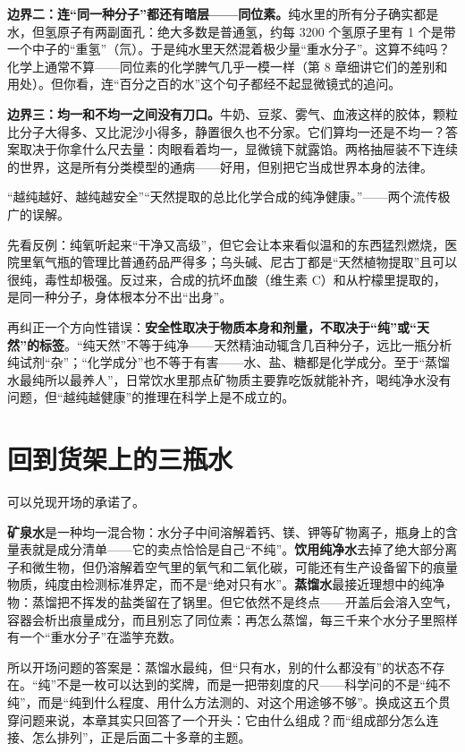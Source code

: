 \textbf{边界二：连“同一种分子”都还有暗层——同位素。}纯水里的所有分子确实都是水，但氢原子有两副面孔：绝大多数是普通氢，约每 3200 个氢原子里有 1 个是带一个中子的“重氢”（氘）。于是纯水里天然混着极少量“重水分子”。这算不纯吗？化学上通常不算——同位素的化学脾气几乎一模一样（第 8 章细讲它们的差别和用处）。但你看，连“百分之百的水”这个句子都经不起显微镜式的追问。

\textbf{边界三：均一和不均一之间没有刀口。}牛奶、豆浆、雾气、血液这样的胶体，颗粒比分子大得多、又比泥沙小得多，静置很久也不分家。它们算均一还是不均一？答案取决于你拿什么尺去量：肉眼看着均一，显微镜下就露馅。两格抽屉装不下连续的世界，这是所有分类模型的通病——好用，但别把它当成世界本身的法律。

\begin{wuqu}
“越纯越好、越纯越安全”“天然提取的总比化学合成的纯净健康。”——两个流传极广的误解。

先看反例：纯氧听起来“干净又高级”，但它会让本来看似温和的东西猛烈燃烧，医院里氧气瓶的管理比普通药品严得多；乌头碱、尼古丁都是“天然植物提取”且可以很纯，毒性却极强。反过来，合成的抗坏血酸（维生素 C）和从柠檬里提取的，是同一种分子，身体根本分不出“出身”。

再纠正一个方向性错误：\textbf{安全性取决于物质本身和剂量，不取决于“纯”或“天然”的标签}。“纯天然”不等于纯净——天然精油动辄含几百种分子，远比一瓶分析纯试剂“杂”；“化学成分”也不等于有害——水、盐、糖都是化学成分。至于“蒸馏水最纯所以最养人”，日常饮水里那点矿物质主要靠吃饭就能补齐，喝纯净水没有问题，但“越纯越健康”的推理在科学上是不成立的。
\end{wuqu}

\section{回到货架上的三瓶水}

可以兑现开场的承诺了。

\textbf{矿泉水}是一种均一混合物：水分子中间溶解着钙、镁、钾等矿物离子，瓶身上的含量表就是成分清单——它的卖点恰恰是自己“不纯”。\textbf{饮用纯净水}去掉了绝大部分离子和微生物，但仍溶解着空气里的氧气和二氧化碳，可能还有生产设备留下的痕量物质，纯度由检测标准界定，而不是“绝对只有水”。\textbf{蒸馏水}最接近理想中的纯净物：蒸馏把不挥发的盐类留在了锅里。但它依然不是终点——开盖后会溶入空气，容器会析出痕量成分，而且别忘了同位素：再怎么蒸馏，每三千来个水分子里照样有一个“重水分子”在滥竽充数。

所以开场问题的答案是：蒸馏水最纯，但“只有水，别的什么都没有”的状态不存在。“纯”不是一枚可以达到的奖牌，而是一把带刻度的尺——科学问的不是“纯不纯”，而是“纯到什么程度、用什么方法测的、对这个用途够不够”。换成这五个贯穿问题来说，本章其实只回答了一个开头：它由什么组成？而“组成部分怎么连接、怎么排列”，正是后面二十多章的主题。

